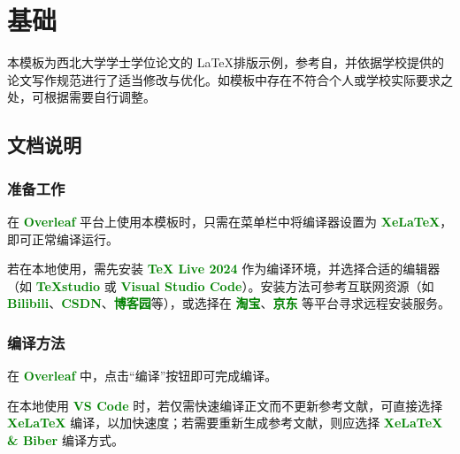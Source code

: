 \chapter[基础]{基础}  %
\songti{}
\linespread{1.67} \selectfont

本模板为西北大学学士学位论文的 \LaTeX 排版示例，参考自\href{https://www.overleaf.com/latex/templates/shan-xi-shi-fan-da-xue-li-gong-ke-lei-ben-ke-sheng-bi-ye-lun-wen-texmo-ban/rkxzpttqqzyt}{\color{red}{陕西师范大学本科生毕业论文模板}}，并依据学校提供的论文写作规范进行了适当修改与优化。如模板中存在不符合个人或学校实际要求之处，可根据需要自行调整。

\section{文档说明}

\subsection{准备工作}

在 \textbf{\textcolor{green}{Overleaf}} 平台上使用本模板时，只需在菜单栏中将编译器设置为 \textbf{\textcolor{green}{XeLaTeX}}，即可正常编译运行。

若在本地使用，需先安装 \textbf{\textcolor{green}{TeX Live 2024}} 作为编译环境，并选择合适的编辑器（如 \textbf{\textcolor{green}{TeXstudio}} 或 \textbf{\textcolor{green}{Visual Studio Code}}）。安装方法可参考互联网资源（如 \textbf{\textcolor{green}{Bilibili}}、\textbf{\textcolor{green}{CSDN}}、\textbf{\textcolor{green}{博客园}}等），或选择在 \textbf{\textcolor{green}{淘宝}}、\textbf{\textcolor{green}{京东}} 等平台寻求远程安装服务。

\subsection{编译方法}

在 \textbf{\textcolor{green}{Overleaf}} 中，点击“编译”按钮即可完成编译。

在本地使用 \textbf{\textcolor{green}{VS Code}} 时，若仅需快速编译正文而不更新参考文献，可直接选择 \textbf{\textcolor{green}{XeLaTeX}} 编译，以加快速度；若需要重新生成参考文献，则应选择 \textbf{\textcolor{green}{XeLaTeX \& Biber}} 编译方式。


